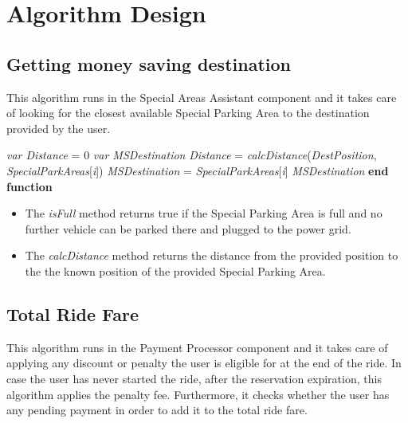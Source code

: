 \section{Algorithm Design}


\subsection{Getting money saving destination}
This algorithm runs in the Special Areas Assistant component and it takes care of looking for the closest available Special Parking Area to the destination provided by the user.

\begin{algorithm}
\caption{}\label{euclid}
\begin{algorithmic}[1]
\State \textit{var Distance} = 0
\State \textit{var MSDestination}
\State \textit{Distance} = \textit{calcDistance}(\textit{DestPosition},\textit{ SpecialParkAreas}[\textit{i}])
\State \textit{MSDestination} = \textit{SpecialParkAreas}[\textit{i}]
\EndIf
\EndFor
\State \Return \textit{MSDestination}
\EndFunction
\State \textbf{end function}
\end{algorithmic}
\end{algorithm}

\begin{itemize}
    \item The \textit{isFull} method returns true if the Special Parking Area is full and no further vehicle can be parked there and plugged to the power grid.
    \item The \textit{calcDistance} method returns the distance from the provided position to the the known position of the provided Special Parking Area.
\end{itemize}



\newpage

\subsection{Total Ride Fare}
This algorithm runs in the Payment Processor component and it takes care of applying any discount or penalty the user is eligible for at the end of the ride. In case the user has never started the ride, after the reservation expiration, this algorithm applies the penalty fee. Furthermore, it checks whether the user has any pending payment in order to add it to the total ride fare.



